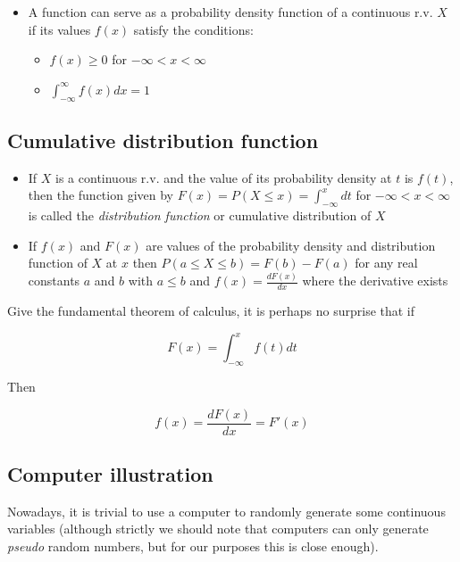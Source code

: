 \documentclass[12pt]{extbook}
\begin{document}
 \begin{itemize}
\item A function can serve as a probability density function of a continuous r.v. $X$ if its values $f(x) $ satisfy the conditions:
\begin{itemize}
\item $f(x) \geq 0$ for $-\infty < x < \infty$
\item $\int_{-\infty}^{\infty} f(x) dx = 1$
\end{itemize}
\end{itemize}

\subsection{Cumulative distribution function}

\begin{itemize}
\item If $X$ is a continuous r.v. and the value of its probability density at $t$ is $f(t)$, then the function given by $F(x) = P(X \leq x) = \int_{-\infty}^{x} dt$ for $-\infty < x < \infty$ is called the \emph{distribution function} or cumulative distribution of $X$
\item If $f(x)$ and $F(x)$ are values of the probability density and distribution function of $X$ at $x$ then $P(a \leq X \leq b) = F(b) - F(a)$ for any real constants $a$ and $b$ with $a \leq b$ and $f(x) = \frac{dF(x)}{dx}$ where the derivative exists
\end{itemize}
 



Give the fundamental theorem of calculus, it is perhaps no surprise that if

\begin{displaymath}
F(x) = \int_{-\infty}^x f(t)dt
\end{displaymath}

Then

\begin{displaymath}
f(x) = \frac{dF(x)}{dx} = F'(x)
\end{displaymath}





\subsection{Computer illustration}

Nowadays, it is trivial to use a computer to randomly generate some continuous variables (although strictly we should note that computers can only generate \emph{pseudo} random numbers, but for our purposes this is close enough).  
\end{document}
